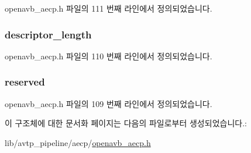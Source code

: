 openavb\+\_\+aecp.\+h 파일의 111 번째 라인에서 정의되었습니다.

\subsubsection[{\texorpdfstring{descriptor\+\_\+length}{descriptor_length}}]{ descriptor\+\_\+length}\hypertarget{structopenavb__aecp__response__data__read__descriptor__t_a991bdb9bb060bb8736e1b2e5fab506e1}{}\label{structopenavb__aecp__response__data__read__descriptor__t_a991bdb9bb060bb8736e1b2e5fab506e1}


openavb\+\_\+aecp.\+h 파일의 110 번째 라인에서 정의되었습니다.

\subsubsection[{\texorpdfstring{reserved}{reserved}}]{ reserved}\hypertarget{structopenavb__aecp__response__data__read__descriptor__t_ac15a687d635cc969d1bfab4d96858b77}{}\label{structopenavb__aecp__response__data__read__descriptor__t_ac15a687d635cc969d1bfab4d96858b77}


openavb\+\_\+aecp.\+h 파일의 109 번째 라인에서 정의되었습니다.



이 구조체에 대한 문서화 페이지는 다음의 파일로부터 생성되었습니다.\+:\begin{DoxyCompactItemize}
\item 
lib/avtp\+\_\+pipeline/aecp/\hyperlink{openavb__aecp_8h}{openavb\+\_\+aecp.\+h}\end{DoxyCompactItemize}
